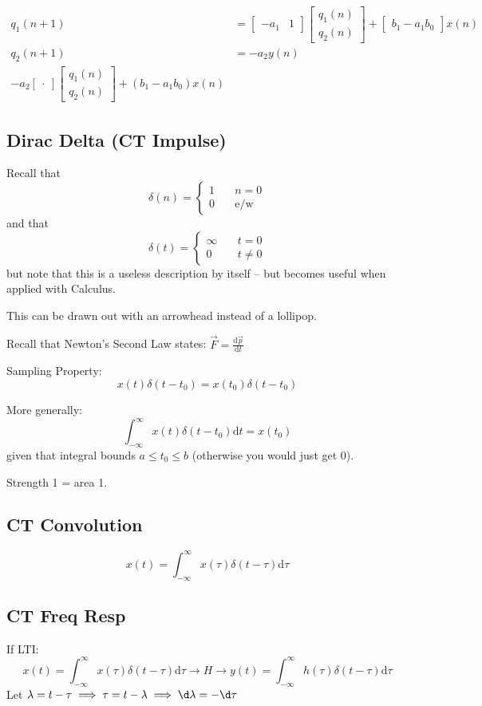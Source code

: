 \begin{align*}
    q_1(n+1) &= \begin{bmatrix}-a_1 & 1\end{bmatrix}
    \begin{bmatrix}
        q_1(n)\\
        q_2(n)
    \end{bmatrix}
    + \begin{bmatrix}
        b_1 - a_1 b_0
    \end{bmatrix} x(n)
    \\
    q_2(n+1) &= -a_2 y(n)  
    \\
    -a_2 \begin{bmatrix}
        .
    \end{bmatrix}
    \begin{bmatrix}
        q_1(n)\\
        q_2(n)
    \end{bmatrix}
    + (
        b_1 - a_1 b_0
    ) x(n)
\end{align*}

\subsection{Dirac Delta (CT Impulse)}
Recall that
\[
    \delta(n) = \begin{cases}
        1 & \quad n = 0
        \\
        0 & \quad \text{e/w}
    \end{cases}
\]
and that
\[
    \delta(t) = \begin{cases}
        \infty & \quad t = 0
        \\
        0 & \quad t\ne0
    \end{cases}
\]
but note that this is a useless description by itself -- but becomes useful when applied with Calculus.

This can be drawn out with an arrowhead instead of a lollipop.

Recall that Newton's Second Law states: $\vec F = \frac{\mathrm{d}\vec p}{\mathrm{d}t}$


Sampling Property:
\[
    x(t)\delta(t-t_0)
    =
    x(t_0)\delta(t-t_0)
\]

More generally:
\[
    \int_{-\infty}^\infty x(t)\delta(t-t_0) \mathrm d t = x(t_0)
\]
given that integral bounds $a \le t_0 \le b$ (otherwise you would just get 0).

Strength 1 = area 1.

\subsection{CT Convolution}
\[
    x(t) 
    = \int_{-\infty}^\infty x(\tau)\delta(t-\tau) \mathrm d\tau
\]

\subsection{CT Freq Resp}
If LTI:
\[
    x(t) 
    = \int_{-\infty}^\infty x(\tau)\delta(t-\tau) \mathrm d\tau
    \to
    \boxed{H}
    \to
    y(t) 
    = \int_{-\infty}^\infty h(\tau)\delta(t-\tau) \mathrm d\tau
\]
Let $\lambda = t - \tau 
\implies \tau=t-\lambda
\implies\d\lambda=-\d\tau$
